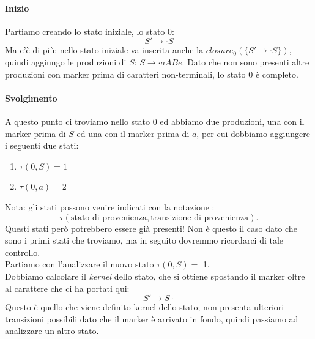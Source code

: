 \documentclass[class=book, crop=false, oneside, 12pt]{standalone}
\begin{document}
\paragraph{Inizio}
Partiamo creando lo stato iniziale, lo stato \(0\):
\begin{equation*}
    S' \to \cdot S
\end{equation*}
Ma c'è di più: nello stato iniziale va inserita anche la \(closure_0(\{ S' \to \cdot S \})\), quindi aggiungo le produzioni di \(S\): \(S \to \cdot aABe\). Dato che non sono presenti altre produzioni con marker prima di caratteri non-terminali, lo stato \(0\) è completo.

\paragraph{Svolgimento}
A questo punto ci troviamo nello stato \(0\) ed abbiamo due produzioni, una con il marker prima di \(S\) ed una con il marker prima di \(a\), per cui dobbiamo aggiungere i seguenti due stati:
\begin{enumerate}
    \item \(\tau (0, S) = 1\)
    \item \(\tau (0, a) = 2\)
\end{enumerate}
Nota: gli stati possono venire indicati con la notazione :
\begin{equation*}
    \tau( \textrm{stato di provenienza}, \textrm{transizione di provenienza}).
\end{equation*}
Questi stati però potrebbero essere già presenti! Non è questo il caso dato che sono i primi stati che troviamo, ma in seguito dovremmo ricordarci di tale controllo. \\

Partiamo con l'analizzare il nuovo stato \(\tau (0, S) =\) 1. \\
Dobbiamo calcolare il \emph{kernel} dello stato, che si ottiene spostando il marker oltre al carattere che ci ha portati qui:
\begin{equation*}
    S' \to S \cdot
\end{equation*}
Questo è quello che viene definito kernel dello stato; non presenta ulteriori transizioni possibili dato che il marker è arrivato in fondo, quindi passiamo ad analizzare un altro stato. \\
\end{document}
